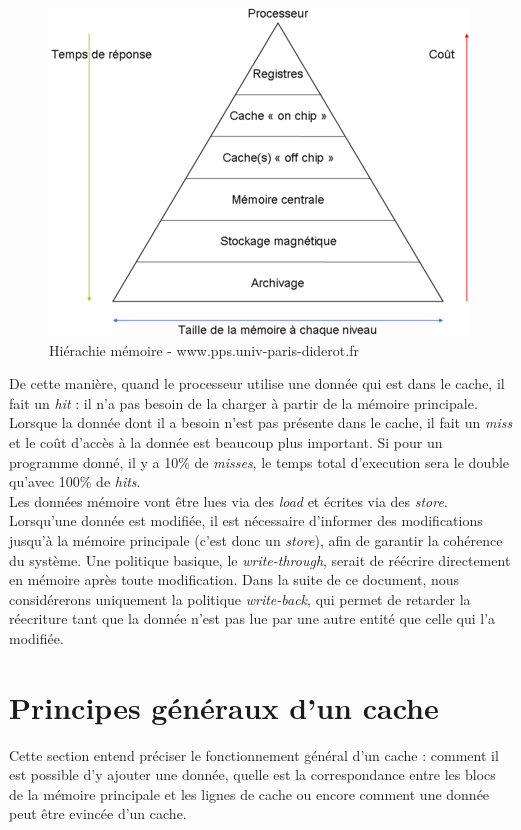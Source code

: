 \begin{figure}[!h]
\begin{center}
   \includegraphics[scale=0.75]{images/hierarchy.png}
   \caption{\label{img:hierarchy} Hiérachie mémoire - www.pps.univ-paris-diderot.fr}
\end{center}
\end{figure}

De cette manière, quand le processeur utilise une donnée qui est dans le cache, il fait un \textit{hit} : il n'a pas besoin de la charger à partir de la mémoire principale. Lorsque la donnée dont il a besoin n'est pas présente dans le cache, il fait un \textit{miss} et le coût d'accès à la donnée est beaucoup plus important. Si pour un programme donné, il y a 10\% de \emph{misses}, le temps total d'execution sera le double qu'avec 100\% de \emph{hits}. \\

Les données mémoire vont être lues via des \textit{load} et écrites via des \textit{store}. Lorsqu'une donnée est modifiée, il est nécessaire d'informer des modifications jusqu'à la mémoire principale (c'est donc un \textit{store}), afin de garantir la cohérence du système. Une politique basique, le \textit{write-through}, serait de réécrire directement en mémoire après toute modification. Dans la suite de ce document, nous considérerons uniquement la politique \textit{write-back}, qui permet de retarder la réecriture tant que la donnée n'est pas lue par une autre entité que celle qui l'a modifiée.

\section{Principes généraux d'un cache}
Cette section entend préciser le fonctionnement général d'un cache : comment il est possible d'y ajouter une donnée, quelle est la correspondance entre les blocs de la mémoire principale et les lignes de cache ou encore comment une donnée peut être evincée d'un cache. \\


